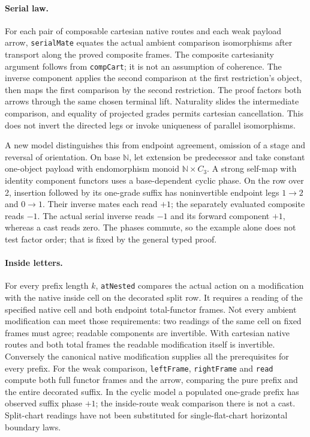 \documentclass[10pt]{article}
\newcommand{\code}{\nolinkurl}\setlength{\emergencystretch}{3em}
\begin{document}
\paragraph{Serial law.} For each pair of composable cartesian native routes and each weak payload arrow, \code{serialMate} equates the actual ambient comparison isomorphisms after transport along the proved composite frames. The composite cartesianity argument follows from \code{compCart}; it is not an assumption of coherence. The inverse component applies the second comparison at the first restriction's object, then maps the first comparison by the second restriction. The proof factors both arrows through the same chosen terminal lift. Naturality slides the intermediate comparison, and equality of projected grades permits cartesian cancellation. This does not invert the directed legs or invoke uniqueness of parallel isomorphisms.
\par A new model distinguishes this from endpoint agreement, omission of a stage and reversal of orientation. On base $\mathbb N$, let extension be predecessor and take constant one-object payload with endomorphism monoid $\mathbb N\times C_3$. A strong self-map with identity component functors uses a base-dependent cyclic phase. On the row over 2, insertion followed by its one-grade suffix has noninvertible endpoint legs $1\to 2$ and $0\to1$. Their inverse mates each read $+1$; the separately evaluated composite reads $-1$. The actual serial inverse reads $-1$ and its forward component $+1$, whereas a cast reads zero. The phases commute, so the example alone does not test factor order; that is fixed by the general typed proof.
\paragraph{Inside letters.} For every prefix length $k$, \code{atNested} compares the actual action on a modification with the native inside cell on the decorated split row. It requires a reading of the specified native cell and both endpoint total-functor frames. Not every ambient modification can meet those requirements: two readings of the same cell on fixed frames must agree; readable components are invertible. With cartesian native routes and both total frames the readable modification itself is invertible. Conversely the canonical native modification supplies all the prerequisites for every prefix. For the weak comparison, \code{leftFrame}, \code{rightFrame} and \code{read} compute both full functor frames and the arrow, comparing the pure prefix and the entire decorated suffix. In the cyclic model a populated one-grade prefix has observed suffix phase $+1$; the inside-route weak comparison there is not a cast. Split-chart readings have not been substituted for single-flat-chart horizontal boundary laws.
\end{document}
